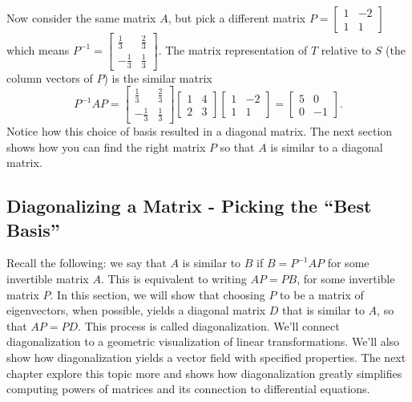 \begin{example}
Now consider the same matrix
 $A$, but pick a different matrix 
$P=
\begin{bmatrix}
 1 & -2 \\
 1 & 1
\end{bmatrix} 
$ which means 
$P^{-1} = 
\begin{bmatrix}
 \frac{1}{3} & \frac{2}{3} \\
 -\frac{1}{3} & \frac{1}{3}
\end{bmatrix} 
$. The matrix representation of $T$ relative to $S$ (the column vectors of $P$) is the similar matrix 
$$
P^{-1}AP=\begin{bmatrix}
 \frac{1}{3} & \frac{2}{3} \\
 -\frac{1}{3} & \frac{1}{3}
\end{bmatrix} 
 \begin{bmatrix}
 1 & 4 \\
 2 & 3
\end{bmatrix} 
\begin{bmatrix}
 1 & -2 \\
 1 & 1
\end{bmatrix} 
=
\begin{bmatrix}
 5 & 0 \\
 0 & -1
\end{bmatrix} 
.$$  Notice how this choice of basis resulted in a diagonal matrix. The next section shows how you can find the right matrix $P$ so that $A$ is similar to a diagonal matrix.
\end{example}


\subsection{Diagonalizing a Matrix - Picking the ``Best Basis'' }
Recall the following: we say that $A$ is similar to $B$ if $B=P^{-1}AP$ for some invertible matrix $A$. 
This is equivalent to writing $AP=PB$, for some invertible matrix $P$. 
In this section, we will show that choosing $P$ to be a matrix of eigenvectors, when possible, yields a diagonal matrix $D$ that is similar to  $A$, so that $AP=PD$. This process is called diagonalization.  We'll connect diagonalization to a geometric visualization of linear transformations. We'll also show how diagonalization yields a vector field with specified properties. The next chapter explore this topic more and shows how diagonalization greatly simplifies computing powers of matrices and its connection to differential equations.

